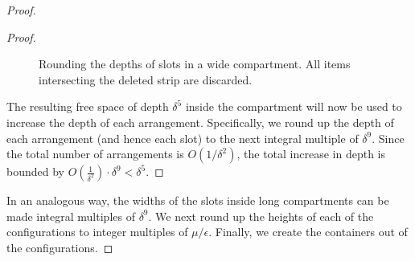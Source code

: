 \begin{proof}
\begin{proof}
\begin{figure}
    \caption{Rounding the depths of slots in a wide compartment.  All items intersecting the deleted strip are discarded.}
    \label{fig:minStrip}
\end{figure}
    
The resulting free space of depth $\delta^5$ inside the compartment will now be used to increase the depth of each arrangement. Specifically, we round up the depth of each arrangement (and hence each slot) to the next integral multiple of $\delta^9$. Since the total number of arrangements is $O(1/\delta^2)$, the total increase in depth is bounded by $O(\frac{1}{\delta^2})\cdot \delta^9 < \delta^5$.  
\end{proof}

In an analogous way, the widths of the slots inside long compartments can be made integral multiples of $\delta^9$. We next round up the heights of each of the configurations to integer multiples of $\mu/\epsilon$. Finally, we create the containers out of the configurations.


\end{proof}

